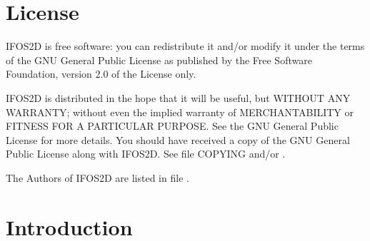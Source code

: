 \chapter{License}\label{license}

IFOS2D is free software: you can redistribute it and/or modify it under the terms of the GNU General Public License as published by the Free Software Foundation, version 2.0 of the License only.
 
IFOS2D is distributed in the hope that it will be useful, but WITHOUT ANY WARRANTY; without even the implied warranty of MERCHANTABILITY or FITNESS FOR A PARTICULAR PURPOSE. See the GNU General Public License for more details. You should have received a copy of the GNU General Public License along with IFOS2D. See file COPYING and/or .

The Authors of IFOS2D are listed in file .



\chapter{Introduction}


